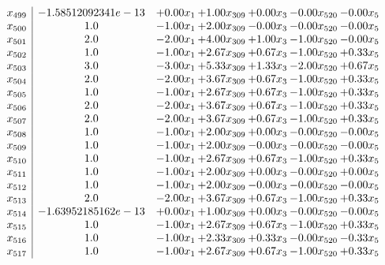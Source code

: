 \documentclass[8pt]{article}
\begin{document}
\[\begin{array}{c| c c@{\hskip 2pt} c@{\hskip 2pt} c@{\hskip 2pt} c@{\hskip 2pt} c@{\hskip 2pt} }
 x_{499}   &  -1.58512092341e-13 & +  0.00 x_{1} & +  1.00 x_{309} & +  0.00 x_{3} & -0.00 x_{520} & -0.00 x_{5}\\
 x_{500}   &  1.0 & -1.00 x_{1} & +  2.00 x_{309} & -0.00 x_{3} & -0.00 x_{520} & -0.00 x_{5}\\
 x_{501}   &  2.0 & -2.00 x_{1} & +  4.00 x_{309} & +  1.00 x_{3} & -1.00 x_{520} & -0.00 x_{5}\\
 x_{502}   &  1.0 & -1.00 x_{1} & +  2.67 x_{309} & +  0.67 x_{3} & -1.00 x_{520} & +  0.33 x_{5}\\
 x_{503}   &  3.0 & -3.00 x_{1} & +  5.33 x_{309} & +  1.33 x_{3} & -2.00 x_{520} & +  0.67 x_{5}\\
 x_{504}   &  2.0 & -2.00 x_{1} & +  3.67 x_{309} & +  0.67 x_{3} & -1.00 x_{520} & +  0.33 x_{5}\\
 x_{505}   &  1.0 & -1.00 x_{1} & +  2.67 x_{309} & +  0.67 x_{3} & -1.00 x_{520} & +  0.33 x_{5}\\
 x_{506}   &  2.0 & -2.00 x_{1} & +  3.67 x_{309} & +  0.67 x_{3} & -1.00 x_{520} & +  0.33 x_{5}\\
 x_{507}   &  2.0 & -2.00 x_{1} & +  3.67 x_{309} & +  0.67 x_{3} & -1.00 x_{520} & +  0.33 x_{5}\\
 x_{508}   &  1.0 & -1.00 x_{1} & +  2.00 x_{309} & +  0.00 x_{3} & -0.00 x_{520} & -0.00 x_{5}\\
 x_{509}   &  1.0 & -1.00 x_{1} & +  2.00 x_{309} & -0.00 x_{3} & -0.00 x_{520} & -0.00 x_{5}\\
 x_{510}   &  1.0 & -1.00 x_{1} & +  2.67 x_{309} & +  0.67 x_{3} & -1.00 x_{520} & +  0.33 x_{5}\\
 x_{511}   &  1.0 & -1.00 x_{1} & +  2.00 x_{309} & +  0.00 x_{3} & -0.00 x_{520} & +  0.00 x_{5}\\
 x_{512}   &  1.0 & -1.00 x_{1} & +  2.00 x_{309} & -0.00 x_{3} & -0.00 x_{520} & -0.00 x_{5}\\
 x_{513}   &  2.0 & -2.00 x_{1} & +  3.67 x_{309} & +  0.67 x_{3} & -1.00 x_{520} & +  0.33 x_{5}\\
 x_{514}   &  -1.63952185162e-13 & +  0.00 x_{1} & +  1.00 x_{309} & +  0.00 x_{3} & -0.00 x_{520} & -0.00 x_{5}\\
 x_{515}   &  1.0 & -1.00 x_{1} & +  2.67 x_{309} & +  0.67 x_{3} & -1.00 x_{520} & +  0.33 x_{5}\\
 x_{516}   &  1.0 & -1.00 x_{1} & +  2.33 x_{309} & +  0.33 x_{3} & -0.00 x_{520} & -0.33 x_{5}\\
 x_{517}   &  1.0 & -1.00 x_{1} & +  2.67 x_{309} & +  0.67 x_{3} & -1.00 x_{520} & +  0.33 x_{5}\\

\end{array}\]
\end{document}
